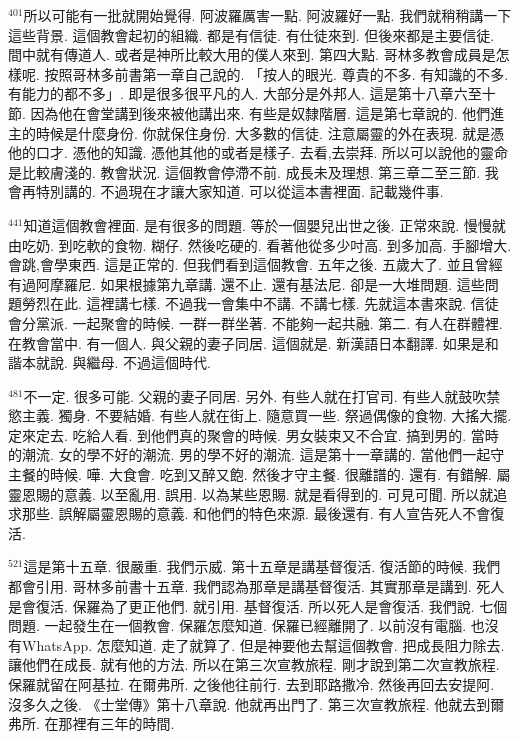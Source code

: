 \documentclass{book}
\begin{document}
$^{401}$所以可能有一批就開始覺得.
阿波羅厲害一點.
阿波羅好一點.
我們就稍稍講一下這些背景.
這個教會起初的組織.
都是有信徒.
有仕徒來到.
但後來都是主要信徒.
間中就有傳道人.
或者是神所比較大用的僕人來到.
第四大點.
哥林多教會成員是怎樣呢.
按照哥林多前書第一章自己說的.
「按人的眼光.
尊貴的不多.
有知識的不多.
有能力的都不多」.
即是很多很平凡的人.
大部分是外邦人.
這是第十八章六至十節.
因為他在會堂講到後來被他講出來.
有些是奴隸階層.
這是第七章說的.
他們進主的時候是什麼身份.
你就保住身份.
大多數的信徒.
注意屬靈的外在表現.
就是憑他的口才.
憑他的知識.
憑他其他的或者是樣子.
去看,去崇拜.
所以可以說他的靈命是比較膚淺的.
教會狀況.
這個教會停滯不前.
成長未及理想.
第三章二至三節.
我會再特別講的.
不過現在才讓大家知道.
可以從這本書裡面.
記載幾件事.

$^{441}$知道這個教會裡面.
是有很多的問題.
等於一個嬰兒出世之後.
正常來說.
慢慢就由吃奶.
到吃軟的食物.
糊仔.
然後吃硬的.
看著他從多少吋高.
到多加高.
手腳增大.
會跳,會學東西.
這是正常的.
但我們看到這個教會.
五年之後.
五歲大了.
並且曾經有過阿摩羅尼.
如果根據第九章講.
還不止.
還有基法尼.
卻是一大堆問題.
這些問題勞烈在此.
這裡講七樣.
不過我一會集中不講.
不講七樣.
先就這本書來說.
信徒會分黨派.
一起聚會的時候.
一群一群坐著.
不能夠一起共融.
第二.
有人在群體裡.
在教會當中.
有一個人.
與父親的妻子同居.
這個就是.
新漢語日本翻譯.
如果是和諧本就說.
與繼母.
不過這個時代.

$^{481}$不一定.
很多可能.
父親的妻子同居.
另外.
有些人就在打官司.
有些人就鼓吹禁慾主義.
獨身.
不要結婚.
有些人就在街上.
隨意買一些.
祭過偶像的食物.
大搖大擺.
定來定去.
吃給人看.
到他們真的聚會的時候.
男女裝束又不合宜.
搞到男的.
當時的潮流.
女的學不好的潮流.
男的學不好的潮流.
這是第十一章講的.
當他們一起守主餐的時候.
嘩.
大食會.
吃到又醉又飽.
然後才守主餐.
很離譜的.
還有.
有錯解.
屬靈恩賜的意義.
以至亂用.
誤用.
以為某些恩賜.
就是看得到的.
可見可聞.
所以就追求那些.
誤解屬靈恩賜的意義.
和他們的特色來源.
最後還有.
有人宣告死人不會復活.

$^{521}$這是第十五章.
很嚴重.
我們示威.
第十五章是講基督復活.
復活節的時候.
我們都會引用.
哥林多前書十五章.
我們認為那章是講基督復活.
其實那章是講到.
死人是會復活.
保羅為了更正他們.
就引用.
基督復活.
所以死人是會復活.
我們說.
七個問題.
一起發生在一個教會.
保羅怎麼知道.
保羅已經離開了.
以前沒有電腦.
也沒有WhatsApp.
怎麼知道.
走了就算了.
但是神要他去幫這個教會.
把成長阻力除去.
讓他們在成長.
就有他的方法.
所以在第三次宣教旅程.
剛才說到第二次宣教旅程.
保羅就留在阿基拉.
在爾弗所.
之後他往前行.
去到耶路撒冷.
然後再回去安提阿.
沒多久之後.
《士堂傳》第十八章說.
他就再出門了.
第三次宣教旅程.
他就去到爾弗所.
在那裡有三年的時間.
\end{document}
